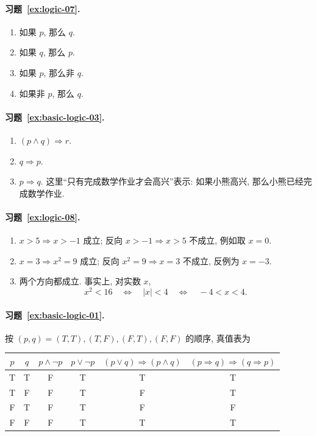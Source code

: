 \documentclass[usesamecnt, thmcnt=section, lang=cn, newtx, 10pt, scheme=chinese]{elegantbook}
\begin{document}
\paragraph*{习题~\ref{ex:logic-07}.}
\begin{enumerate}[label=\rm(\arabic*)]
  \item 如果 $p$, 那么 $q$.
  \item 如果 $q$, 那么 $p$.
  \item 如果 $p$, 那么非 $q$.
  \item 如果非 $p$, 那么 $q$.
\end{enumerate}

\paragraph*{习题~\ref{ex:basic-logic-03}.}
\begin{enumerate}[label=\rm(\arabic*)]
  \item $(p\wedge q)\Rightarrow r$.
  \item $q\Rightarrow p$.
  \item $p\Rightarrow q$. 这里``只有完成数学作业才会高兴''表示: 如果小熊高兴, 那么小熊已经完成数学作业.
\end{enumerate}

\paragraph*{习题~\ref{ex:logic-08}.}
\begin{enumerate}[label=\rm(\arabic*)]
  \item $x>5\Rightarrow x>-1$ 成立; 反向 $x>-1\Rightarrow x>5$ 不成立, 例如取 $x=0$.
  \item $x=3\Rightarrow x^2=9$ 成立; 反向 $x^2=9\Rightarrow x=3$ 不成立, 反例为 $x=-3$.
  \item 两个方向都成立. 事实上, 对实数 $x$,
  \[
    x^2<16\quad\Leftrightarrow\quad |x|<4\quad\Leftrightarrow\quad -4<x<4.
  \]
\end{enumerate}

\paragraph*{习题~\ref{ex:basic-logic-01}.}
按 $(p,q)=(T,T),(T,F),(F,T),(F,F)$ 的顺序, 真值表为
\begin{table}[H]
\centering
\begin{tabular}{|c|c|c|c|c|c|}
\hline
$p$ & $q$ & $p\wedge\neg p$ & $p\vee\neg p$ & $(p\vee q)\Rightarrow(p\wedge q)$ & $(p\Rightarrow q)\Rightarrow(q\Rightarrow p)$\\
\hline
T & T & F & T & T & T\\
T & F & F & T & F & T\\
F & T & F & T & F & F\\
F & F & F & T & T & T\\
\hline
\end{tabular}
\end{table}
\end{document}
